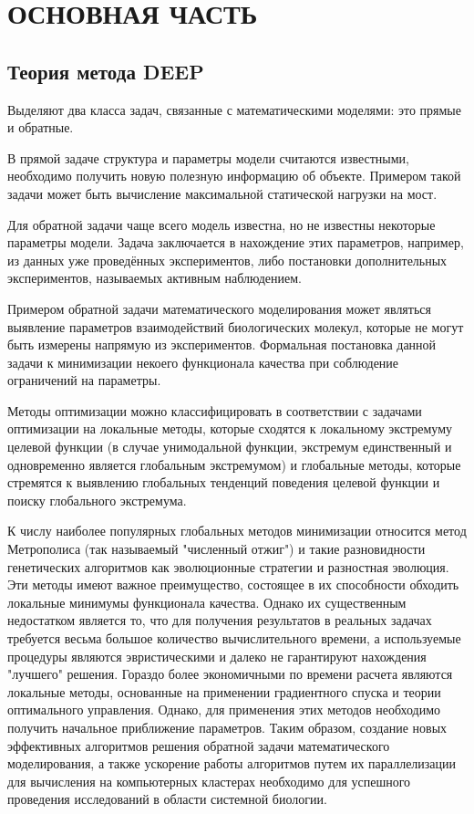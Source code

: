 \setcounter{figure}{0} \setcounter{table}{0} \setcounter{equation}{0}
\chapter*{ОСНОВНАЯ ЧАСТЬ}
\section*{Теория метода DEEP}

Выделяют два класса задач, связанные с математическими моделями: это прямые и обратные.

В прямой задаче структура и параметры модели считаются известными, необходимо получить новую полезную информацию об объекте. Примером такой задачи может быть вычисление максимальной статической нагрузки на мост.

Для обратной задачи чаще всего модель известна, но не известны некоторые параметры модели. Задача заключается в нахождение этих параметров, например, из данных уже проведённых экспериментов, либо постановки дополнительных экспериментов, называемых активным наблюдением.

Примером обратной задачи математического моделирования может являться выявление параметров взаимодействий биологических молекул, которые не могут быть измерены напрямую из экспериментов. Формальная постановка данной задачи к минимизации некоего функционала качества при соблюдение ограничений на параметры.

Методы оптимизации можно классифицировать в соответствии с задачами оптимизации на локальные методы, которые сходятся к локальному экстремуму целевой функции (в случае унимодальной функции, экстремум единственный и одновременно является глобальным экстремумом) и глобальные методы, которые стремятся к выявлению глобальных тенденций поведения целевой функции и поиску глобального экстремума.


К числу наиболее популярных глобальных методов минимизации относится метод Метрополиса (так называемый "численный отжиг") и такие разновидности генетических алгоритмов как эволюционные стратегии и разностная эволюция.
Эти методы имеют важное преимущество, состоящее в их способности обходить локальные минимумы функционала качества.
Однако их существенным недостатком является то, что для получения результатов в реальных задачах требуется весьма большое количество вычислительного времени, а используемые процедуры являются эвристическими и далеко не гарантируют нахождения "лучшего" решения.
Гораздо более экономичными по времени расчета являются локальные методы, основанные на применении градиентного спуска и теории оптимального управления.
Однако, для применения этих методов необходимо получить начальное приближение параметров.
Таким образом, создание новых эффективных алгоритмов решения обратной задачи математического моделирования, а также ускорение работы алгоритмов путем их параллелизации для вычисления на компьютерных кластерах необходимо для успешного проведения исследований в области системной биологии.

